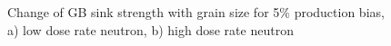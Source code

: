 \documentclass[a4paper]{article}
\begin{document}
      \begin{figure}[h!]  %
        \centering
        \qquad
        \caption{Change of GB sink strength with grain size for 5\% production bias, a) low dose rate neutron, b) high dose rate neutron}
        \label{figure:sink_strengths_neutron_5_1e-6}
      \end{figure}
\end{document}
